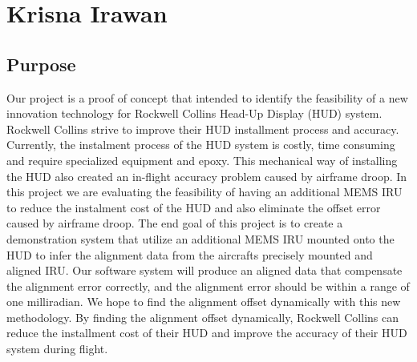 \newpage
\section{Krisna Irawan}
\subsection{Purpose}
Our project is a proof of concept that intended to identify the feasibility of a new innovation technology for Rockwell Collins Head-Up Display (HUD) system. Rockwell Collins strive to improve their HUD installment process and accuracy. Currently, the instalment process of the HUD system is costly, time consuming and require specialized equipment and epoxy. This mechanical way of installing the HUD also created an in-flight accuracy problem caused by airframe droop. In this project we are evaluating the feasibility of having an additional MEMS IRU to reduce the instalment cost of the HUD and also eliminate the offset error caused by airframe droop. The end goal of this project is to create a demonstration system that utilize an additional MEMS IRU mounted onto the HUD to infer the alignment data from the aircrafts precisely mounted and aligned IRU. Our software system will produce an aligned data that compensate the alignment error correctly, and the alignment error should be within a range of one milliradian. We hope to find the alignment offset dynamically with this new methodology. By finding the alignment offset dynamically, Rockwell Collins can reduce the installment cost of their HUD and improve the accuracy of their HUD system during flight. 

